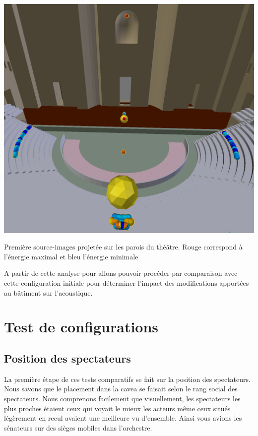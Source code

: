 \begin{figureth}
	\includegraphics[width=0.8\linewidth]{images/si_configInitale}
	\caption{Première source-images projetée sur les parois du théâtre. Rouge correspond à l'énergie maximal et bleu l'énergie minimale}
	\label{si_configInitale}
\end{figureth}

A partir de cette analyse pour allons pouvoir procéder par comparaison avec cette configuration initiale pour déterminer l'impact des modifications apportées au bâtiment sur l'acoustique.
		
\chapter{Test de configurations}
	\minitoc
	\newpage

\section{Position des spectateurs}
La première étape de ces tests comparatifs se fait sur la position des spectateurs. Nous savons que le placement dans la \gls{cavea} se faisait selon le rang social des spectateurs. Nous comprenons facilement que visuellement, les spectateurs les plus proches étaient ceux qui voyait le mieux les acteurs même ceux situés légèrement en recul avaient une meilleure vu d'ensemble. Ainsi vous avions les sénateurs sur des sièges mobiles dans l'orchestre.

